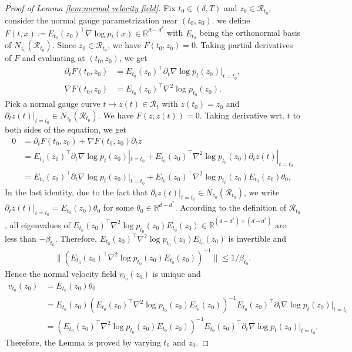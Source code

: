\documentclass[11pt]{article}
\newcommand{\mb}{\mathbb}
\newcommand{\mc}{\mathcal}
\begin{document}
\begin{proof}[Proof of Lemma \ref{lem:normal velocity field}] 

\noindent Fix $t_0\in (\delta,T)$ and $z_0\in \mc{R}_{t_0}$, consider the normal gauge parametrization near $(t_0,z_0)$. we define $F(t,x)\coloneqq E_{t_0}(z_0)^\intercal \nabla \log p_t(x)\in \mb{R}^{d-d^*}$ with $E_{t_0}$ being the orthonormal basis of $N_{z_0}(\mc{R}_{t_0})$. Since $z_0\in \mc{R}_{t_0}$, we have $F(t_0,z_0)=0$. Taking partial derivatives of $F$ and evaluating at $(t_0,z_0)$, we get
\begin{align*}
    \partial_t F(t_0,z_0)  & = E_{t_0}(z_0)^\intercal \partial_t \nabla\log p_{t}(z_0)|_{t=t_0}, \\
    \nabla F(t_0,z_0)  & = E_{t_0}(z_0)^\intercal \nabla^2\log p_{t_0}(z_0).
\end{align*}
Pick a normal gauge curve $t\mapsto z(t)\in \mc{R}_t$ with $z(t_0)=z_0$ and $\partial_t z(t)|_{t=t_0}\in N_{z_0}(\mc{R}_{t_0})$. We have $F(z, z(t))=0$. Taking derivative wrt. $t$ to both sides of the equation, we get
\begin{align*}
    0 & = \partial_t F(t_0,z_0) + \nabla F(t_0,z_0) \partial_t z \\
    & = E_{t_0}(z_0)^\intercal \partial_t \nabla\log p_{t}(z_0)|_{t=t_0} + E_{t_0}(z_0)^\intercal \nabla^2\log p_{t_0}(z_0) \partial_t z(t)|_{t=t_0} \\
    & = E_{t_0}(z_0)^\intercal \partial_t \nabla\log p_{t}(z_0)|_{t=t_0} + E_{t_0}(z_0)^\intercal \nabla^2\log p_{t_0}(z_0) E_{t_0}(z_0) \theta_0,
\end{align*}
In the last identity, due to the fact that $\partial_t z(t)|_{t=t_0}\in N_{z_0}(\mc{R}_{t_0})$, we write $\partial_t z(t)|_{t=t_0}=E_{t_0}(z_0) \theta_0$ for some $\theta_0\in \mb{R}^{d-d^*}$. According to the definition of $\mc{R}_{t_0}$, all eigenvalues of $E_{t_0}(z_0)^\intercal \nabla^2\log p_{t_0}(z_0) E_{t_0}(z_0)\in \mb{R}^{(d-d^*)\times (d-d^*)}$ are less than $-\beta_{t_0}$. Therefore, $E_{t_0}(z_0)^\intercal \nabla^2\log p_{t_0}(z_0) E_{t_0}(z_0)$ is invertible and 
\begin{align*}
    \| (E_{t_0}(z_0)^\intercal \nabla^2\log p_{t_0}(z_0) E_{t_0}(z_0))^{-1} \|\le 1/\beta_{t_0}.
\end{align*}
Hence the normal velocity field $v_{t_0}(z_0)$ is unique and 
\begin{align*}
    v_{t_0}(z_0) & = E_{t_0}(z_0) \theta_0 \\
    & = E_{t_0}(z_0) (E_{t_0}(z_0)^\intercal \nabla^2\log p_{t_0}(z_0) E_{t_0}(z_0))^{-1} E_{t_0}(z_0)^\intercal \partial_t \nabla\log p_{t}(z_0)|_{t=t_0}\\
    &=(E_{t_0}(z_0)^\intercal \nabla^2\log p_{t_0}(z_0) E_{t_0}(z_0))^{-1} E_{t_0}(z_0)^\intercal \partial_t \nabla\log p_{t}(z_0)|_{t=t_0}.
\end{align*}
Therefore, the Lemma is proved by varying $t_0$ and $z_0$.
\end{proof}
\end{document}
